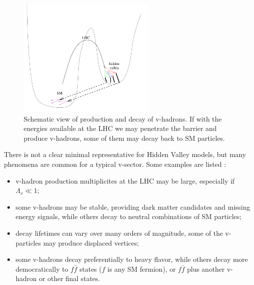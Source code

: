\begin{figure}[htbp]
\centering
\includegraphics[width=0.6\textwidth]{plots/intro/hiddenvalley.pdf}
\caption{Schematic view of production and decay of v-hadrons. If with the energies
available at the LHC we may penetrate the barrier and produce v-hadrons, some of them may
decay back to SM particles. \label{fig:hv}}
\end{figure}

There is not a clear minimal representative for Hidden Valley models, but
many phenomena are common for a typical v-sector. Some examples are listed
\cite{Strassler:2006ri,Han:2007ae,Strassler:2008fv}:
\begin{itemize}
\item v-hadron production multiplicites at the LHC may be large, especially if $\Lambda_v\ll1$\TeV;
\item some v-hadrons may be stable, providing dark matter candidates and missing energy signals,
while others decay to neutral combinations of SM particles;
\item decay lifetimes can vary over many orders of magnitude, some of the v-particles may produce
displaced vertices;
\item some v-hadrons decay preferentially to heavy flavor, while others decay more democratically
to $f\bar{f}$ states ($f$ is any SM fermion), or $f\bar{f}$ plus another v-hadron or other final
states.
\end{itemize}

